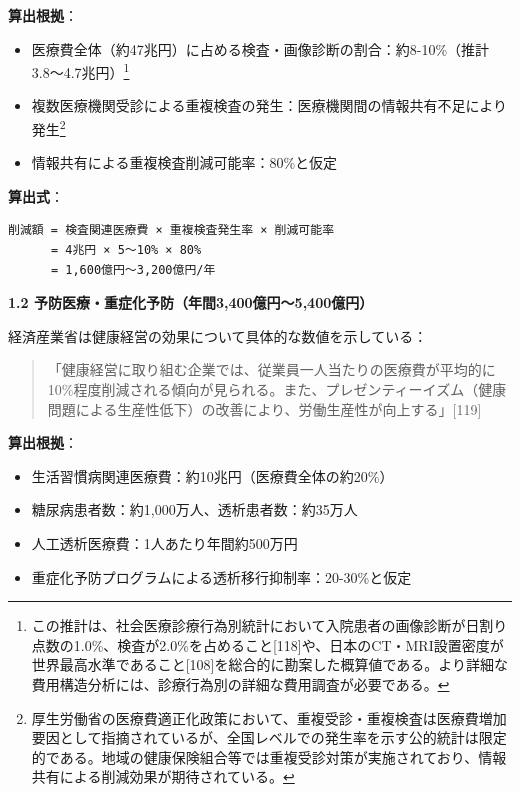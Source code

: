 \documentclass[
  a4paper,
  a4paper,
  11pt]{ltjsbook}
\providecommand{\tightlist}{%
  \setlength{\itemsep}{0pt}\setlength{\parskip}{0pt}}
\begin{document}
\textbf{算出根拠}：

\begin{itemize}
\tightlist
\item
  医療費全体（約47兆円）に占める検査・画像診断の割合：約8-10\%（推計3.8〜4.7兆円）\footnote{この推計は、社会医療診療行為別統計において入院患者の画像診断が日割り点数の1.0\%、検査が2.0\%を占めること{[}118{]}や、日本のCT・MRI設置密度が世界最高水準であること{[}108{]}を総合的に勘案した概算値である。より詳細な費用構造分析には、診療行為別の詳細な費用調査が必要である。}
\end{itemize}

\begin{itemize}
\tightlist
\item
  複数医療機関受診による重複検査の発生：医療機関間の情報共有不足により発生\footnote{厚生労働省の医療費適正化政策において、重複受診・重複検査は医療費増加要因として指摘されているが、全国レベルでの発生率を示す公的統計は限定的である。地域の健康保険組合等では重複受診対策が実施されており、情報共有による削減効果が期待されている。}
\end{itemize}

\begin{itemize}
\tightlist
\item
  情報共有による重複検査削減可能率：80\%と仮定
\end{itemize}

\textbf{算出式}：

\begin{verbatim}
削減額 = 検査関連医療費 × 重複検査発生率 × 削減可能率
      = 4兆円 × 5〜10% × 80%
      = 1,600億円〜3,200億円/年
\end{verbatim}

\textbf{1.2 予防医療・重症化予防（年間3,400億円〜5,400億円）}

経済産業省は健康経営の効果について具体的な数値を示している：

\begin{quote}
「健康経営に取り組む企業では、従業員一人当たりの医療費が平均的に10\%程度削減される傾向が見られる。また、プレゼンティーイズム（健康問題による生産性低下）の改善により、労働生産性が向上する」{[}119{]}
\end{quote}

\textbf{算出根拠}：

\begin{itemize}
\tightlist
\item
  生活習慣病関連医療費：約10兆円（医療費全体の約20\%）
\item
  糖尿病患者数：約1,000万人、透析患者数：約35万人
\item
  人工透析医療費：1人あたり年間約500万円
\item
  重症化予防プログラムによる透析移行抑制率：20-30\%と仮定
\end{itemize}
\end{document}
